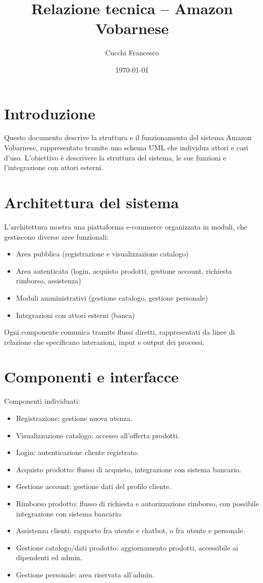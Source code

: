 \documentclass[a4paper,12pt]{article}
\title{Relazione tecnica – Amazon Vobarnese}
\author{Cucchi Francesco}
\date{\today}
\begin{document}
\maketitle

\section{Introduzione}
Questo documento descrive la struttura e il funzionamento del sistema Amazon Vobarnese, rappresentato tramite uno schema UML che individua attori e casi d'uso. L’obiettivo è descrivere la struttura del sistema, le sue funzioni e l’integrazione con attori esterni.

\section{Architettura del sistema}
L’architettura mostra una piattaforma e-commerce organizzata in moduli, che gestiscono diverse aree funzionali:
\begin{itemize}
  \item Area pubblica (registrazione e visualizzazione catalogo)
  \item Area autenticata (login, acquisto prodotti, gestione account, richiesta rimborso, assistenza)
  \item Moduli amministrativi (gestione catalogo, gestione personale)
  \item Integrazioni con attori esterni (banca)
\end{itemize}
Ogni componente comunica tramite flussi diretti, rappresentati da linee di relazione che specificano interazioni, input e output dei processi.

\section{Componenti e interfacce}
Componenti individuati:
\begin{itemize}
  \item Registrazione: gestione nuova utenza.
  \item Visualizzazione catalogo: accesso all’offerta prodotti.
  \item Login: autenticazione cliente registrato.
  \item Acquisto prodotto: flusso di acquisto, integrazione con sistema bancario.
  \item Gestione account: gestione dati del profilo cliente.
  \item Rimborso prodotto: flusso di richiesta e autorizzazione rimborso, con possibile integrazione con sistema bancario.
  \item Assistenza clienti: rapporto fra utente e chatbot, o fra utente e personale.
  \item Gestione catalogo/dati prodotto: aggiornamento prodotti, accessibile ai dipendenti ed admin.
  \item Gestione personale: area riservata all’admin.
\end{itemize}
\end{document}
